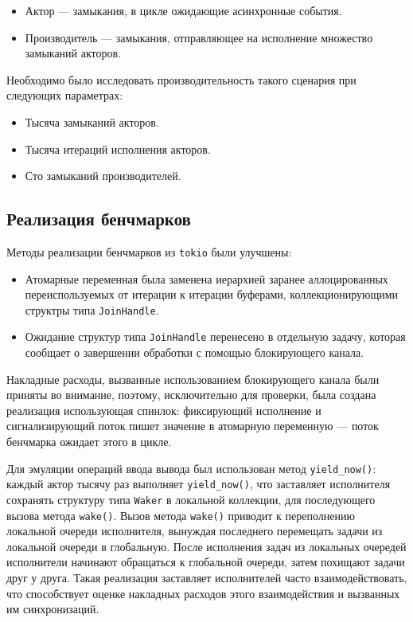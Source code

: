\begin{itemize}
    \item Актор --- замыкания, в цикле ожидающие асинхронные события.
    \item Производитель --- замыкания, отправляющее на исполнение множество замыканий акторов.
\end{itemize}

Необходимо было исследовать производительность такого сценария при следующих параметрах:

\begin{itemize}
    \item Тысяча замыканий акторов.
    \item Тысяча итераций исполнения акторов.
    \item Сто замыканий производителей.
\end{itemize}

\subsection{Реализация бенчмарков}

Методы реализации бенчмарков из \verb|tokio| были улучшены:

\begin{itemize}
    \item Атомарные переменная была заменена иерархией заранее аллоцированных переиспользуемых от итерации к итерации буферами, коллекционирующими структры типа \verb|JoinHandle|.
    \item Ожидание структур типа \verb|JoinHandle| перенесено в отдельную задачу, которая сообщает о завершении обработки с помощью блокирующего канала.
\end{itemize}

Накладные расходы, вызванные использованием блокирующего канала были приняты во внимание, поэтому, исключительно для проверки, была создана реализация использующая спинлок: фиксирующий исполнение и сигнализирующий поток пишет значение в атомарную переменную --- поток бенчмарка ожидает этого в цикле.

Для эмуляции операций ввода вывода был использован метод \verb|yield_now()|: каждый актор тысячу раз выполняет \verb|yield_now()|, что заставляет исполнителя сохранять структуру типа \verb|Waker| в локальной коллекции, для последующего вызова метода \verb|wake()|. Вызов метода \verb|wake()| приводит к переполнению локальной очереди исполнителя, вынуждая последнего перемещать задачи из локальной очереди в глобальную. После исполнения задач из локальных очередей исполнители начинают обращаться к глобальной очереди, затем похищают задачи друг у друга. Такая реализация заставляет исполнителей часто взаимодействовать, что способствует оценке накладных расходов этого взаимодействия и вызванных им синхронизаций.
